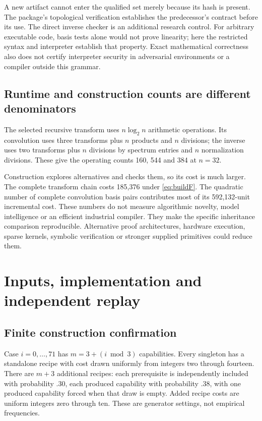 \documentclass[11pt,letterpaper]{article}
\theoremstyle{definition}\newtheorem{definition}[theorem]{Definition}
\theoremstyle{remark}\newtheorem{remark}[theorem]{Remark}
\begin{document}
A new artifact cannot enter the qualified set merely because its hash is present. The package's topological verification establishes the predecessor's contract before its use. The direct inverse checker is an additional research control. For arbitrary executable code, basis tests alone would not prove linearity; here the restricted syntax and interpreter establish that property. Exact mathematical correctness also does not certify interpreter security in adversarial environments or a compiler outside this grammar.

\subsection{Runtime and construction counts are different denominators}
The selected recursive transform uses $n\log_2n$ arithmetic operations. Its convolution uses three transforms plus $n$ products and $n$ divisions; the inverse uses two transforms plus $n$ divisions by spectrum entries and $n$ normalization divisions. These give the operating counts 160, 544 and 384 at $n=32$.

Construction explores alternatives and checks them, so its cost is much larger. The complete transform chain costs 185,376 under \eqref{eq:buildF}. The quadratic number of complete convolution basis pairs contributes most of its 592,132-unit incremental cost. These numbers do not measure algorithmic novelty, model intelligence or an efficient industrial compiler. They make the specific inheritance comparison reproducible. Alternative proof architectures, hardware execution, sparse kernels, symbolic verification or stronger supplied primitives could reduce them.

\section{Inputs, implementation and independent replay}
\subsection{Finite construction confirmation}
Case $i=0,\ldots,71$ has $m=3+(i\bmod3)$ capabilities. Every singleton has a standalone recipe with cost drawn uniformly from integers two through fourteen. There are $m+3$ additional recipes: each prerequisite is independently included with probability .30, each produced capability with probability .38, with one produced capability forced when that draw is empty. Added recipe costs are uniform integers zero through ten. These are generator settings, not empirical frequencies.
\end{document}
